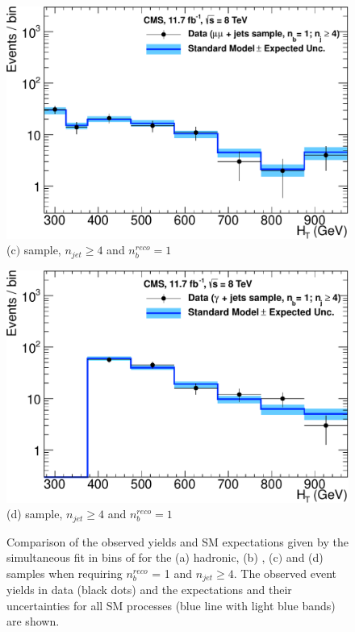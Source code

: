 \begin{figure}[ht]
\begin{minipage}[b]{0.48 \linewidth}
\includegraphics[width = 1.0\linewidth]{plots/mumu_1b_ge4j_logy.pdf}
\centering (c$)$ \dimupjets sample, $n_{jet} \geq 4$ and $n_{b}^{reco} = 1$ 
\end{minipage}
\quad
\begin{minipage}[b]{0.48\linewidth}
\includegraphics[width = 1.0\linewidth]{plots/photon_1b_ge4j_logy.pdf}
\centering (d)  \gpjets sample, $n_{jet} \geq 4$ and $n_{b}^{reco} = 1$ 
\end{minipage}
\caption[Comparison of the observed yields and \ac{SM} expectations given by the simultaneous fit in bins of \theht for the (a) hadronic, (b) \mupjets, (c$)$ \dimupjets and (d) \gpjets samples when requiring $n_{b}^{reco}$ = 1 and $n_{jet} \geq 4$.]{Comparison of the observed yields and \ac{SM} expectations given by the simultaneous fit in bins of \theht for the (a) hadronic, (b) \mupjets, (c$)$ \dimupjets and (d) \gpjets samples when requiring $n_{b}^{reco}$ = 1 and $n_{jet} \geq 4$. The observed event yields in data (black dots) and the expectations and their uncertainties for all SM processes (blue line with light blue bands) are shown.}
\label{fig:result1bhigh}
\end{figure}

